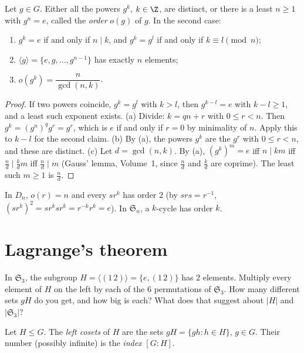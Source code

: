 \begin{proposition}\label{prop:order}
Let $g\in G$. Either all the powers $g^k$, $k\in\Z$, are distinct, or there is a least $n\ge1$ with $g^n=e$, called the \emph{order} $o(g)$ of $g$. In the second case:
\begin{enumerate}[label=(\alph*)]
\item $g^k=e$ if and only if $n\mid k$, and $g^k=g^l$ if and only if $k\equiv l\pmod n$;
\item $\langle g\rangle=\{e,g,\dots,g^{n-1}\}$ has exactly $n$ elements;
\item $o(g^k)=\dfrac n{\gcd(n,k)}$.
\end{enumerate}
\end{proposition}
\begin{proof}
If two powers coincide, $g^k=g^l$ with $k>l$, then $g^{k-l}=e$ with $k-l\ge1$, and a least such exponent exists.
(a) Divide: $k=qn+r$ with $0\le r<n$. Then $g^k=(g^n)^qg^r=g^r$, which is $e$ if and only if $r=0$ by minimality of $n$. Apply this to $k-l$ for the second claim.
(b) By (a), the powers $g^k$ are the $g^r$ with $0\le r<n$, and these are distinct.
(c) Let $d=\gcd(n,k)$. By (a), $(g^k)^m=e$ iff $n\mid km$ iff $\frac nd\mid\frac kdm$ iff $\frac nd\mid m$ (Gauss' lemma, Volume~1, since $\frac nd$ and $\frac kd$ are coprime). The least such $m\ge1$ is $\frac nd$.
\end{proof}

In $D_n$, $o(r)=n$ and every $sr^k$ has order $2$ (by $srs=r^{-1}$, $(sr^k)^2=sr^ksr^k=r^{-k}r^k=e$). In $\mathfrak S_n$, a $k$-cycle has order $k$.

\section{Lagrange's theorem}

\begin{think}
In $\mathfrak S_3$, the subgroup $H=\langle(1\,2)\rangle=\{e,(1\,2)\}$ has $2$ elements. Multiply every element of $H$ on the left by each of the $6$ permutations of $\mathfrak S_3$. How many different sets $gH$ do you get, and how big is each? What does that suggest about $|H|$ and $|\mathfrak S_3|$?
\end{think}

\begin{definition}
Let $H\le G$. The \emph{left cosets} of $H$ are the sets $gH=\{gh:h\in H\}$, $g\in G$. Their number (possibly infinite) is the \emph{index} $[G:H]$.
\end{definition}

